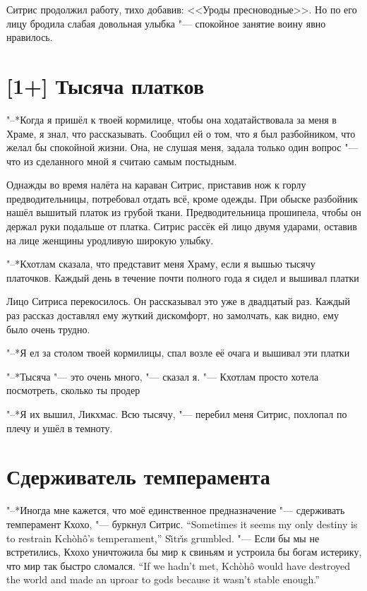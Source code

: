 Ситрис продолжил работу, тихо добавив: <<Уроды пресноводные>>.
Но по его лицу бродила слабая довольная улыбка "--- спокойное занятие воину явно нравилось.

\section{[1+] Тысяча платков}

"--*Когда я пришёл к твоей кормилице, чтобы она ходатайствовала за меня в Храме, я знал, что рассказывать.
Сообщил ей о том, что я был разбойником, что желал бы спокойной жизни.
Она, не слушая меня, задала только один вопрос "--- что из сделанного мной я считаю самым постыдным.

Однажды во время налёта на караван Ситрис, приставив нож к горлу предводительницы, потребовал отдать всё, кроме одежды.
При обыске разбойник нашёл вышитый платок из грубой ткани.
Предводительница прошипела, чтобы он держал руки подальше от платка.
Ситрис рассёк ей лицо двумя ударами, оставив на лице женщины уродливую широкую улыбку.

"--*Кхотлам сказала, что представит меня Храму, если я вышью тысячу платочков.
Каждый день в течение почти полного года я сидел и вышивал платки\ldotst

Лицо Ситриса перекосилось.
Он рассказывал это уже в двадцатый раз.
Каждый раз рассказ доставлял ему жуткий дискомфорт, но замолчать, как видно, ему было очень трудно.

"--*Я ел за столом твоей кормилицы, спал возле её очага и вышивал эти платки\ldotst

"--*Тысяча "--- это очень много, "--- сказал я.
"--- Кхотлам просто хотела посмотреть, сколько ты продер\ldotst

"--*Я их вышил, Ликхмас.
Всю тысячу, "--- перебил меня Ситрис, похлопал по плечу и ушёл в темноту.

\section{Сдерживатель темперамента}

{"--*Иногда мне кажется, что моё единственное предназначение "--- сдерживать темперамент Кхохо, "--- буркнул Ситрис.}
{``Sometimes it seems my only destiny is to restrain Kch\`{o}h\^{o}'s temperament,'' S\~{\i}tr\v{\i}s grumbled.}
{"--- Если бы мы не встретились, Кхохо уничтожила бы мир к свиньям и устроила бы богам истерику, что мир так быстро сломался.}
{``If we hadn't met, Kch\`{o}h\^{o} would have destroyed the world and made an uproar to gods because it wasn't stable enough.''}

